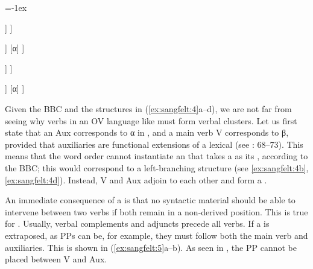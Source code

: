 \documentclass[output=paper, colorlinks, citecolor=brown]{langscibook}
\begin{document}
\ea
\label{ex:sangfelt:4} 
\columnsep=-1ex
\begin{multicols}{4}
\ea \label{ex:sangfelt:4a}
\begin{forest}
	[αP
		 [α]
		  [βP 
		  	 [β] 
		  	 [Comp]
  	 	 ]
	 ]
\end{forest}

\ex\label{ex:sangfelt:4b} 
\begin{forest}
	[αP 
		[βP 
			[β] 
			[Comp]
			]
		[α] 
	]	
\end{forest}

\ex \label{ex:sangfelt:4c} 
\begin{forest}
	[αP
		[α]
		[βP
			[Comp] 
			[β]
		]
	]
\end{forest}

\ex \label{ex:sangfelt:4d} 
\begin{forest}
		[αP
			[βP
				[Comp]
				[β]
			]
			[α]
		]
\end{forest}

\z 
\end{multicols}
\z

         

Given the BBC and the structures in (\ref{ex:sangfelt:4}a–d), we are not far from seeing why verbs in an OV language like  must form verbal clusters. Let us first state that an  Aux corresponds to α in , and a main verb V corresponds to β, provided that auxiliaries are functional extensions of a lexical  (see \citealt{Haider2013}: 68–73). This means that the  word order  cannot instantiate an  that takes a  as its , according to the BBC; this would correspond to a left-branching structure (see \ref{ex:sangfelt:4b}, \ref{ex:sangfelt:4d}). Instead, V and Aux adjoin to each other and form a .

An immediate consequence of a  is that no syntactic material should be able to intervene between two verbs if both remain in a non-derived position. This is true for . Usually, verbal complements and adjuncts precede all verbs. If a  is extraposed, as PPs can be, for example, they must follow both the main verb and auxiliaries. This is shown in (\ref{ex:sangfelt:5}a–b). As seen in , the PP cannot be placed between V and Aux.


\ea {}\label{ex:sangfelt:5}
\end{document}

